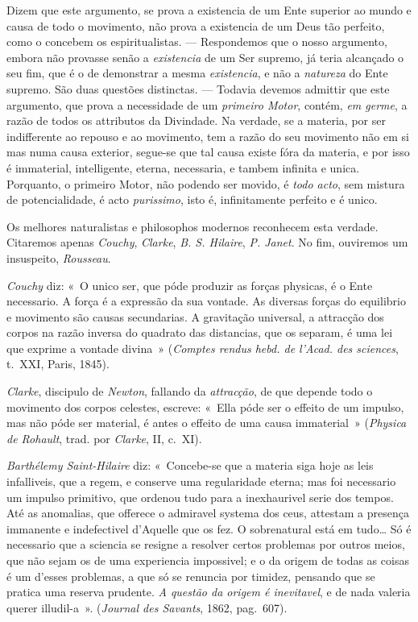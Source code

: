 {Dizem que este argumento, se prova a existencia de um Ente superior ao mundo e causa de
todo o movimento, não prova a existencia de um Deus tão perfeito, como o concebem os
espiritualistas. --- Respondemos que o nosso argumento, embora não provasse senão a
\emph{existencia} de um Ser supremo, já teria alcançado o seu fim, que é o de demonstrar
a mesma \emph{existencia}, e não a \emph{natureza} do Ente supremo. São duas questões
distinctas. --- Todavia devemos admittir que este argumento, que prova a necessidade de
um \emph{primeiro Motor}, contém, \emph{em germe}, a razão de todos os attributos da
Divindade.
Na verdade, se a materia, por ser indifferente ao repouso e ao movimento, tem a razão do
seu movimento não em si mas numa causa exterior, segue-se que tal causa existe fóra da
materia, e por isso é immaterial, intelligente, eterna, necessaria, e tambem infinita e
unica. Porquanto, o primeiro Motor, não podendo ser movido, é \emph{todo acto}, sem
mistura de potencialidade, é acto \emph{purissimo}, isto é, infinitamente perfeito e é
unico.

Os melhores naturalistas e philosophos modernos reconhecem esta verdade. Citaremos
apenas \emph{Couchy}, \emph{Clarke}, \emph{B. S. Hilaire}, \emph{P. Janet}. No fim,
ouviremos um insuspeito, \emph{Rousseau}.

\emph{Couchy} diz: «~O unico ser, que póde produzir as forças physicas, é o Ente
necessario. A força é a expressão da sua vontade. As diversas forças do equilibrio e
movimento são causas secundarias. A gravitação universal, a attracção dos corpos na
razão inversa do quadrato das distancias, que os separam, é uma lei que exprime a
vontade divina~» (\emph{Comptes rendus hebd. de l'Acad. des sciences}, t.~XXI, Paris,
1845).

\emph{Clarke}, discipulo de \emph{Newton}, fallando da \emph{attracção}, de que depende
todo o movimento dos corpos celestes, escreve: «~Ella póde ser o effeito de um impulso,
mas não póde ser material, é antes o effeito de uma causa immaterial~» (\emph{Physica de
Rohault}, trad. por \emph{Clarke}, II, c.~XI).

\emph{Barthélemy Saint-Hilaire} diz: «~Concebe-se que a materia siga hoje as leis
infalliveis, que a regem, e conserve uma regularidade eterna; mas foi necessario um
impulso primitivo, que ordenou tudo para a inexhaurivel serie dos tempos. Até as
anomalias, que offerece o admiravel systema dos ceus, attestam a presença immanente e
indefectivel d'Aquelle que os fez. O sobrenatural está em tudo\dots{} Só é necessario
que a sciencia se resigne a resolver certos problemas por outros meios, que não sejam os
de uma experiencia impossivel; e o da origem de todas as coisas é um d'esses problemas,
a que só se renuncia por timidez, pensando que se pratica uma reserva prudente.
\emph{A questão da origem é inevitavel}, e de nada valeria querer illudil-a~».
(\emph{Journal des Savants}, 1862, pag.~607).

}
